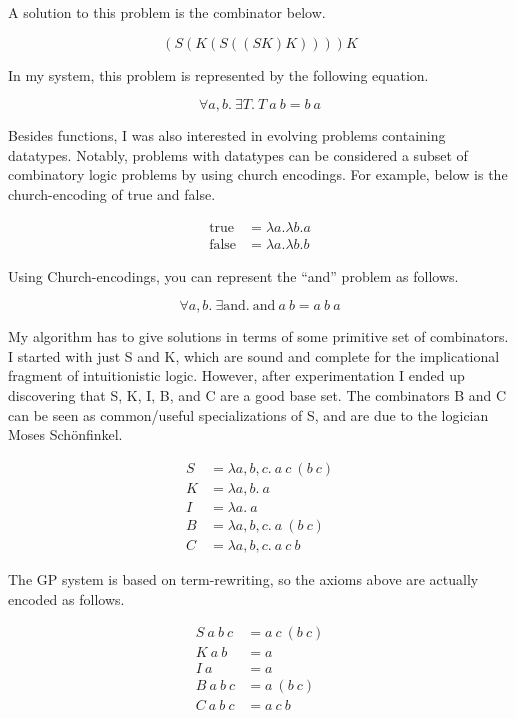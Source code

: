\documentclass{article}
\newcommand{\n}[1]{\textrm{#1}}
\begin{document}
A solution to this problem is the combinator below.

$$
(S(K(S((SK)K))))K
$$

In my system, this problem is represented by the following equation.

$$
\forall a,b . ~ \exists T . ~ T ~ a ~ b = b ~ a
$$

Besides functions, I was also interested in evolving problems
containing datatypes. Notably, problems with datatypes can be
considered a subset of combinatory logic problems by using church
encodings. For example, below is the church-encoding of true and
false.

\begin{align*}
\n{true} &= \lambda a. \lambda b. a\\
\n{false} &= \lambda a. \lambda b. b
\end{align*}

Using Church-encodings, you can represent the ``and'' problem as
follows.

$$
\forall a,b . ~ \exists \n{and} . ~ \n{and} ~ a ~ b = a ~ b ~ a
$$

My algorithm has to give solutions in terms of some primitive set of
combinators. I started with just S and K, which are sound and complete
for the implicational fragment of intuitionistic logic. However, after
experimentation I ended up discovering that S, K, I, B, and C are a
good base set. The combinators B and C can be seen as common/useful
specializations of S, and are due to the logician Moses Sch{\"o}nfinkel.

\begin{align*}
S &= \lambda a,b,c . ~ a ~ c ~ (b ~ c)\\
K &= \lambda a,b . ~ a\\
I &= \lambda a . ~ a\\
B &= \lambda a,b,c . ~ a ~ (b ~ c)\\
C &= \lambda a,b,c . ~ a ~ c ~ b
\end{align*}

The GP system is based on term-rewriting, so the axioms above are
actually encoded as follows.

\begin{align*}
S ~ a ~ b ~ c &= a ~ c ~ (b ~ c)\\
K ~ a ~ b &= a\\
I ~ a &= a\\
B ~ a ~ b ~ c &= a ~ (b ~ c)\\
C ~ a ~ b ~ c &= a ~ c ~ b
\end{align*}
\end{document}
